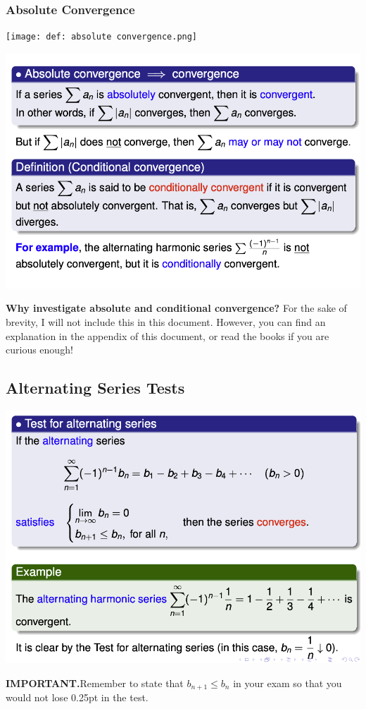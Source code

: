 \documentclass{article}
\begin{document}
\subsubsection{Absolute Convergence}
 \begin{center}
        \texttt{[image: def: absolute convergence.png]}
    \end{center} 
 \begin{center}
        \includegraphics[scale = 0.7]{conditional convergence.png}
    \end{center} 
\textbf{Why investigate absolute and conditional convergence?} For the sake of brevity, I will not include this in this document. However, you can find an explanation in the appendix of this document, or read the books if you are curious enough! 
\subsection{Alternating Series Tests}
 \begin{center}
        \includegraphics[scale = 0.7]{Screenshot 2023-12-07 at 1.06.23 PM.png}
    \end{center} 
\textbf{IMPORTANT.}Remember to state that $b_{n+1} \leq b_n$ in your exam so that you would not lose 0.25pt in the test.  
\end{document}
